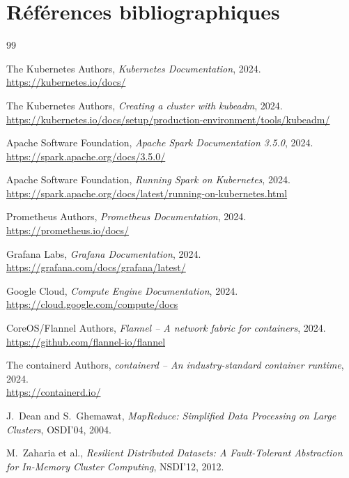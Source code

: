 \documentclass[12pt,a4paper,french]{report}
\begin{document}
\chapter*{Références bibliographiques}

\begin{thebibliography}{99}

The Kubernetes Authors, \textit{Kubernetes Documentation}, 2024.\\
\url{https://kubernetes.io/docs/}

The Kubernetes Authors, \textit{Creating a cluster with kubeadm}, 2024.\\
\url{https://kubernetes.io/docs/setup/production-environment/tools/kubeadm/}

Apache Software Foundation, \textit{Apache Spark Documentation 3.5.0}, 2024.\\
\url{https://spark.apache.org/docs/3.5.0/}

Apache Software Foundation, \textit{Running Spark on Kubernetes}, 2024.\\
\url{https://spark.apache.org/docs/latest/running-on-kubernetes.html}

Prometheus Authors, \textit{Prometheus Documentation}, 2024.\\
\url{https://prometheus.io/docs/}

Grafana Labs, \textit{Grafana Documentation}, 2024.\\
\url{https://grafana.com/docs/grafana/latest/}

Google Cloud, \textit{Compute Engine Documentation}, 2024.\\
\url{https://cloud.google.com/compute/docs}

CoreOS/Flannel Authors, \textit{Flannel -- A network fabric for containers}, 2024.\\
\url{https://github.com/flannel-io/flannel}

The containerd Authors, \textit{containerd -- An industry-standard container runtime}, 2024.\\
\url{https://containerd.io/}

J.~Dean and S.~Ghemawat, \textit{MapReduce: Simplified Data Processing on Large Clusters}, OSDI'04, 2004.

M.~Zaharia et al., \textit{Resilient Distributed Datasets: A Fault-Tolerant Abstraction for In-Memory Cluster Computing}, NSDI'12, 2012.

\end{thebibliography}
\end{document}
